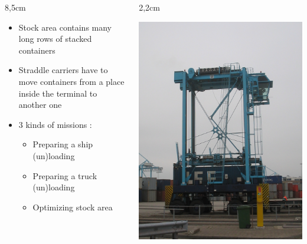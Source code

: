 \documentclass{beamer}
\begin{document}
\begin{frame}
	\begin{columns}
 	 	\begin{column}[l]{8,5cm}
 		\begin{itemize} 
\item Stock area contains many long rows of stacked containers		
\item Straddle carriers have to move containers from a place inside the terminal to another one
		\item 3 kinds of missions : 
			\begin{itemize}
				\item Preparing a ship (un)loading
				\item Preparing a truck (un)loading
				\item Optimizing stock area
			\end{itemize}
	\end{itemize}
	\end{column}
 	 	\begin{column}[r]{2,2cm}
			\begin{flushright}
			    \includegraphics[height=.4\textheight]{fig/Containerlift_straddle_carrier.jpg}
			\end{flushright}
		\end{column}
 	\end{columns}

	
\end{frame}
\end{document}
